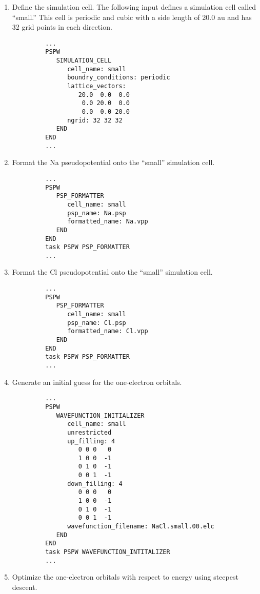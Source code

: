 \begin{enumerate}
\item Define the simulation cell.  
      The following input defines a simulation cell called ``small.'' This
      cell is periodic and cubic with a side length of 20.0 au and has
      32 grid points in each direction.  
\tiny   \begin{verbatim}
         ...
         PSPW
            SIMULATION_CELL
               cell_name: small
               boundry_conditions: periodic
               lattice_vectors:
                  20.0  0.0  0.0 
                   0.0 20.0  0.0 
                   0.0  0.0 20.0 
               ngrid: 32 32 32
            END
         END
         ...
   \end{verbatim}
\normalsize
\item Format the Na pseudopotential onto the ``small'' simulation cell.
\tiny   \begin{verbatim}
         ...
         PSPW
            PSP_FORMATTER
               cell_name: small
               psp_name: Na.psp
               formatted_name: Na.vpp
            END
         END
         task PSPW PSP_FORMATTER
         ...
   \end{verbatim}
\normalsize
\item Format the Cl pseudopotential onto the ``small'' simulation cell.
\tiny   \begin{verbatim}
         ...
         PSPW
            PSP_FORMATTER
               cell_name: small
               psp_name: Cl.psp
               formatted_name: Cl.vpp
            END
         END
         task PSPW PSP_FORMATTER
         ...
   \end{verbatim}
\normalsize
\item Generate an initial guess for the one-electron orbitals.
\tiny   \begin{verbatim}
         ...
         PSPW
            WAVEFUNCTION_INITIALIZER
               cell_name: small
               unrestricted
               up_filling: 4
                  0 0 0   0 
                  1 0 0  -1
                  0 1 0  -1
                  0 0 1  -1
               down_filling: 4
                  0 0 0   0
                  1 0 0  -1
                  0 1 0  -1
                  0 0 1  -1
               wavefunction_filename: NaCl.small.00.elc
            END
         END
         task PSPW WAVEFUNCTION_INTITALIZER
         ...
   \end{verbatim}
\normalsize
\item Optimize the one-electron orbitals with respect to energy using
      steepest descent.

\end{enumerate}
